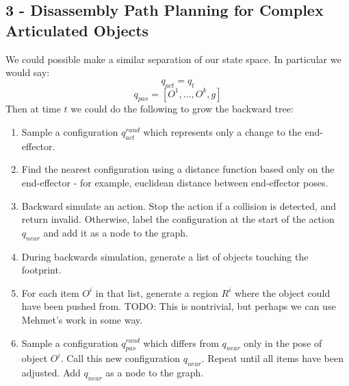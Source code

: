 \documentclass[11pt, oneside]{article}   	%
\begin{document}
\subsection*{3 - Disassembly Path Planning for Complex Articulated Objects}
We could possible make a similar separation of our state space.  In particular we would say:
\[q_{act} = q_t \]
\[q_{pas} =  \left[O^1,...,O^k, g\right]\]
Then at time $t$ we could do the following to grow the backward tree:
\begin{enumerate}
\item Sample a configuration $q_{act}^{rand}$ which represents only a change to the end-effector.
\item Find the nearest configuration using a distance function based only on the end-effector - for example, euclidean distance between end-effector poses.
\item Backward simulate an action. Stop the action if a collision is detected, and return invalid.  Otherwise, label the configuration at the start of the action $q_{near}$ and add it as a node to the graph. 
\item During backwards simulation, generate a list of objects touching the footprint.
\item For each item $O^i$ in that list, generate a region $R^i$ where the object could have been pushed from. TODO: This is nontrivial, but perhaps we can use Mehmet's work in some way.
\item Sample a configuration $q_{pas}^{rand}$ which differs from $q_{near}$ only in the pose of object $O^i$. Call this new configuration $q_{near}$. Repeat until all items have been adjusted. Add $q_{near}$ as a node to the graph.
\end{enumerate}
\end{document}
